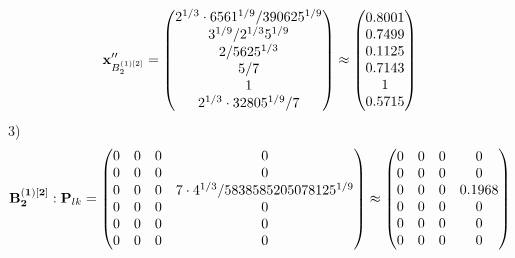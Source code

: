 \documentclass[10pt,a4paper]{article}
\begin{document}
	\[
		\bold{x}''_{B_2^{(1)[2]}} = 
		\begin{pmatrix}
			{{2^ {1 / 3}} \cdot {6561^ {1 / 9}}} / {{390625^ {1 / 9}}} \\
			{{3^ {1 / 9}}} / {{2^ {1 / 3}}{5^ {1 / 9}}} \\
			{{2}} / {{5625^ {1 / 3}}} \\
			{{5}} / {{7}} \\
			{1}{} \\
			{{2^ {1 / 3}} \cdot {32805^ {1 / 9}}} / {{7}} \\
		\end{pmatrix}
		\approx
		\begin{pmatrix}
			0.8001   \\
			0.7499   \\
			0.1125   \\
			0.7143   \\
			1        \\
			0.5715   \\
		\end{pmatrix}
	\]
	3)
	\[
		\bold{B_2^{(1)[2]}}: \bold{P}_{lk} = 
		\begin{pmatrix}
			{{0}}{} & {{0}}{} & {{0}}{} & {{0}}{} \\
			{{0}}{} & {{0}}{} & {{0}}{} & {{0}}{} \\
			{{0}}{} & {{0}}{} & {{0}}{} & {{7} \cdot {4^ {1 / 3}}} / {{5838585205078125^ {1 / 9}}} \\
			{{0}}{} & {{0}}{} & {{0}}{} & {{0}}{} \\
			{{0}}{} & {{0}}{} & {{0}}{} & {{0}}{} \\
			{{0}}{} & {{0}}{} & {{0}}{} & {{0}}{} \\
		\end{pmatrix}
		\approx
		\begin{pmatrix}
			0        & 0        & 0        & 0        \\
			0        & 0        & 0        & 0        \\
			0        & 0        & 0        & 0.1968   \\
			0        & 0        & 0        & 0        \\
			0        & 0        & 0        & 0        \\
			0        & 0        & 0        & 0        \\
		\end{pmatrix}
	\]
\end{document}
